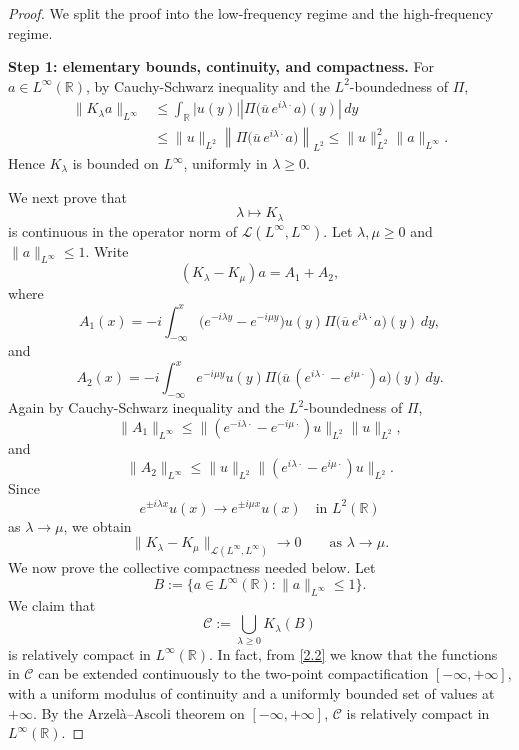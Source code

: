 \documentclass[10pt]{article}
\numberwithin{equation}{section}
\numberwithin{theorem}{section}
\begin{document}
\begin{proof}
We split the proof into the low-frequency regime and the high-frequency regime.

\medskip
\noindent\textbf{Step 1: elementary bounds, continuity, and compactness.}
For \(a\in L^\infty(\mathbb R)\), by Cauchy-Schwarz inequality and the \(L^2\)-boundedness of
\(\Pi\),
\begin{equation}
\label{2.8.1}
\begin{aligned}
\|K_\lambda a\|_{L^\infty}
&\le
\int_{\mathbb R}|u(y)|
\left|
\Pi\bigl(\overline u\,e^{i\lambda\cdot}a\bigr)(y)
\right|\,dy  \\
&\le
\|u\|_{L^2}
\left\|
\Pi\bigl(\overline u\,e^{i\lambda\cdot}a\bigr)
\right\|_{L^2}
\le
\|u\|_{L^2}^2\|a\|_{L^\infty}.
\end{aligned}
\end{equation}
Hence \(K_\lambda\) is bounded on \(L^\infty\), uniformly in \(\lambda\ge0\).

We next prove that
\[
\lambda\mapsto K_\lambda
\]
is continuous in the operator norm of
\(\mathcal L(L^\infty,L^\infty)\). Let \(\lambda,\mu\ge0\) and
\(\|a\|_{L^\infty}\le1\). Write
\[
(K_\lambda-K_\mu)a=A_1+A_2,
\]
where
\[
A_1(x)
=
-i\int_{-\infty}^x
\bigl(e^{-i\lambda y}-e^{-i\mu y}\bigr)u(y)
\Pi\bigl(\overline u\,e^{i\lambda\cdot}a\bigr)(y)\,dy,
\]
and
\[
A_2(x)
=
-i\int_{-\infty}^x
e^{-i\mu y}u(y)
\Pi\bigl(\overline u\,(e^{i\lambda\cdot}-e^{i\mu\cdot})a\bigr)(y)\,dy.
\]
Again by Cauchy-Schwarz inequality and the \(L^2\)-boundedness of \(\Pi\),
\[
\|A_1\|_{L^\infty}
\le
\|(e^{-i\lambda\cdot}-e^{-i\mu\cdot})u\|_{L^2}\|u\|_{L^2},
\]
and
\[
\|A_2\|_{L^\infty}
\le
\|u\|_{L^2}\|(e^{i\lambda\cdot}-e^{i\mu\cdot})u\|_{L^2}.
\]
Since
\[
e^{\pm i\lambda x}u(x)\to e^{\pm i\mu x}u(x)
\quad\text{in }L^2(\mathbb R)
\]
as \(\lambda\to\mu\), we obtain
\begin{equation}
\label{2.8.2}
\|K_\lambda-K_\mu\|_{\mathcal L(L^\infty,L^\infty)}
\to0
\qquad\text{as }\lambda\to\mu.
\end{equation}
We now prove the collective compactness needed below. Let
\[
B:=\{a\in L^\infty(\mathbb R):\|a\|_{L^\infty}\le1\}.
\]
We claim that
\[
\mathcal C:=\bigcup_{\lambda\ge0}K_\lambda(B)
\]
is relatively compact in \(L^\infty(\mathbb R)\). In fact, from \eqref{2.2} we know that the functions in \(\mathcal C\) can be extended
continuously to the two-point compactification \([-\infty,+\infty]\), with a uniform
modulus of continuity and a uniformly bounded set of values at \(+\infty\). By the
Arzelà--Ascoli theorem on \([-\infty,+\infty]\), \(\mathcal C\) is relatively compact in
\(L^\infty(\mathbb R)\).


\end{proof}
\end{document}
